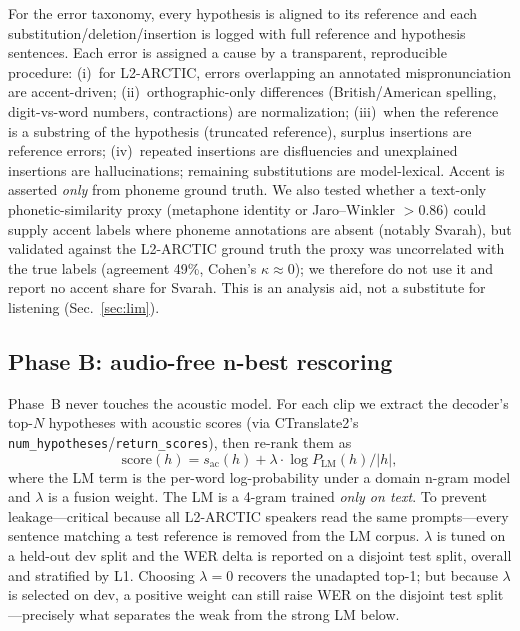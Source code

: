 \documentclass[conference]{IEEEtran}
\begin{document}
For the error taxonomy, every hypothesis is aligned to its reference and each substitution/deletion/insertion is logged with full reference and hypothesis sentences. Each error is assigned a cause by a transparent, reproducible procedure: (i)~for L2-ARCTIC, errors overlapping an annotated mispronunciation are accent-driven; (ii)~orthographic-only differences (British/American spelling, digit-vs-word numbers, contractions) are normalization; (iii)~when the reference is a substring of the hypothesis (truncated reference), surplus insertions are reference errors; (iv)~repeated insertions are disfluencies and unexplained insertions are hallucinations; remaining substitutions are model-lexical. Accent is asserted \emph{only} from phoneme ground truth. We also tested whether a text-only phonetic-similarity proxy (metaphone identity or Jaro--Winkler $>0.86$) could supply accent labels where phoneme annotations are absent (notably Svarah), but validated against the L2-ARCTIC ground truth the proxy was uncorrelated with the true labels (agreement 49\%, Cohen's $\kappa\approx0$); we therefore do not use it and report no accent share for Svarah. This is an analysis aid, not a substitute for listening (Sec.~\ref{sec:lim}).

\subsection{Phase B: audio-free n-best rescoring}
Phase~B never touches the acoustic model. For each clip we extract the decoder's top-$N$ hypotheses with acoustic scores (via CTranslate2's \texttt{num\_hypotheses}/\texttt{return\_scores}), then re-rank them as
\begin{equation}
\mathrm{score}(h) = s_{\mathrm{ac}}(h) + \lambda \cdot \log P_{\mathrm{LM}}(h)/|h|,
\end{equation}
where the LM term is the per-word log-probability under a domain n-gram model and $\lambda$ is a fusion weight. The LM is a 4-gram trained \emph{only on text}. To prevent leakage---critical because all L2-ARCTIC speakers read the same prompts---every sentence matching a test reference is removed from the LM corpus. $\lambda$ is tuned on a held-out dev split and the WER delta is reported on a disjoint test split, overall and stratified by L1. Choosing $\lambda=0$ recovers the unadapted top-1; but because $\lambda$ is selected on dev, a positive weight can still raise WER on the disjoint test split---precisely what separates the weak from the strong LM below.
\end{document}
